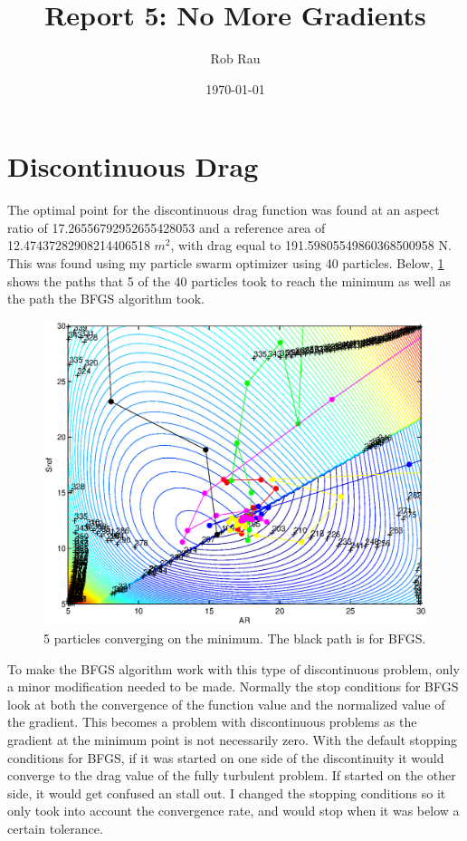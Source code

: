 \documentclass[12pt,parskip=full]{article}
\numberwithin{subsection}{section}
\begin{document}
	\vspace{-2ex}
	\title{Report 5: No More Gradients\vspace{-3.5ex}}
	\author{Rob Rau\vspace{-4ex}}
	\date{\today\vspace{-4ex}}
	\maketitle
	
	\section{Discontinuous Drag}
		The optimal point for the discontinuous drag function was found at an aspect ratio of 17.26556792952655428053
		and a reference area of 12.47437282908214406518 $m^2$, with drag equal to 191.59805549860368500958 N. This was
		found using my particle swarm optimizer using 40 particles. Below, \cref{Fig:psoPoints} shows the paths that 5
		of the 40 particles took to reach the minimum as well as the path the BFGS algorithm took.
		\begin{figure}[!ht]
			\centering
				\includegraphics[scale=0.9]{ParticleSwarmDragPoints2.eps}
			\caption{5 particles converging on the minimum. The black path is for BFGS.\label{Fig:psoPoints}}
		\end{figure}
		
		To make the BFGS algorithm work with this type of discontinuous problem, only a minor modification needed to
		be made. Normally the stop conditions for BFGS look at both the convergence of the function value and the
		normalized value of the gradient. This becomes a problem with discontinuous problems as the gradient at the
		minimum point is not necessarily zero. With the default stopping conditions for BFGS, if it was started 
		on one side of the discontinuity it would converge to the drag value of the fully turbulent problem. If 
		started on the other side, it would get confused an stall out. I changed the stopping conditions so it only
		took into account the convergence rate, and would stop when it was below a certain tolerance.
		
\end{document}
